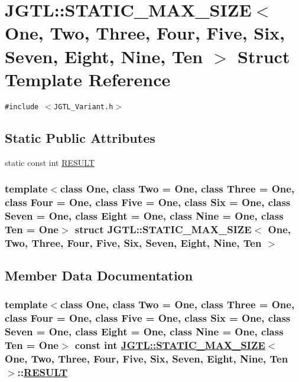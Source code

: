 \hypertarget{struct_j_g_t_l_1_1_s_t_a_t_i_c___m_a_x___s_i_z_e}{
\section{JGTL::STATIC\_\-MAX\_\-SIZE$<$ One, Two, Three, Four, Five, Six, Seven, Eight, Nine, Ten $>$ Struct Template Reference}
\label{struct_j_g_t_l_1_1_s_t_a_t_i_c___m_a_x___s_i_z_e}
}
{\tt \#include $<$JGTL\_\-Variant.h$>$}

\subsection*{Static Public Attributes}
\begin{CompactItemize}
\item 
static const int \hyperlink{struct_j_g_t_l_1_1_s_t_a_t_i_c___m_a_x___s_i_z_e_5976ed1e8db916f40b5dc6987ed095b8}{RESULT}
\end{CompactItemize}
\subsubsection*{template$<$class One, class Two = One, class Three = One, class Four = One, class Five = One, class Six = One, class Seven = One, class Eight = One, class Nine = One, class Ten = One$>$ struct JGTL::STATIC\_\-MAX\_\-SIZE$<$ One, Two, Three, Four, Five, Six, Seven, Eight, Nine, Ten $>$}



\subsection{Member Data Documentation}
\hypertarget{struct_j_g_t_l_1_1_s_t_a_t_i_c___m_a_x___s_i_z_e_5976ed1e8db916f40b5dc6987ed095b8}{
\subsubsection[RESULT]{\setlength{\rightskip}{0pt plus 5cm}template$<$class One, class Two = One, class Three = One, class Four = One, class Five = One, class Six = One, class Seven = One, class Eight = One, class Nine = One, class Ten = One$>$ const int \hyperlink{struct_j_g_t_l_1_1_s_t_a_t_i_c___m_a_x___s_i_z_e}{JGTL::STATIC\_\-MAX\_\-SIZE}$<$ One, Two, Three, Four, Five, Six, Seven, Eight, Nine, Ten $>$::\hyperlink{struct_j_g_t_l_1_1_s_t_a_t_i_c___m_a_x___s_i_z_e_5976ed1e8db916f40b5dc6987ed095b8}{RESULT}}}
\label{struct_j_g_t_l_1_1_s_t_a_t_i_c___m_a_x___s_i_z_e_5976ed1e8db916f40b5dc6987ed095b8}


